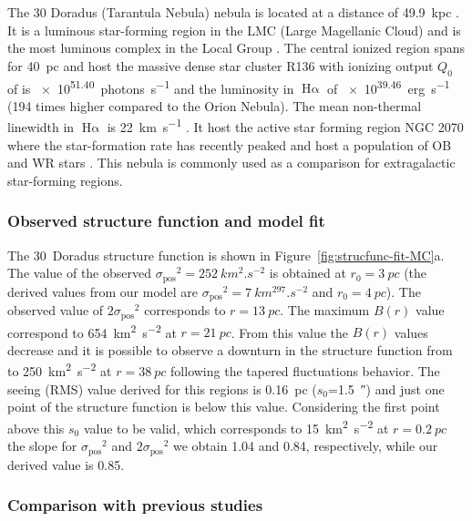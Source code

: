 \documentclass[fleqn,usenatbib, useAMS, a4paper]{mnras}
\newcommand\pos{\ensuremath{_{\mathrm{pos}}}}
\newcommand\ha{\ensuremath{\text{H}\upalpha}}
\begin{document}
The 30 Doradus (Tarantula Nebula) nebula is located at a distance of \SI{49.9}{kpc} \citetext{\SI{1}{\arcsecond} = \SI{0.24}{pc} ; \citealp{2013Natur.495...76P}}.
It is a luminous star-forming region in the LMC (Large Magellanic Cloud) and is the most luminous complex in the Local Group \citep{1984ApJ...287..116K}.
The central ionized region spans for \SI{40}{pc} and host the massive dense star cluster R136
with ionizing output \(Q_0\) of is \SI{e51.40}{photons.s^{-1}} \citep{2020MNRAS.499.1918B} and the luminosity in \ha{} of \SI{e39.46}{erg.s^{-1}} (194 times higher compared to the Orion Nebula).
The mean non-thermal linewidth in \ha{} is \SI{22}{km.s^{-1}} \citep{2013A&A...555A..60T}.
It host the active star forming region NGC 2070 \citep{2013AJ....145...98W} where the star-formation rate has recently peaked \citep{2015ApJ...811...76C} and host a population of OB and WR stars \citep{2011A&A...530A.108E}.
This nebula is commonly used as a comparison for extragalactic star-forming regions.

\subsubsection{Observed structure function and model fit}
\label{sec:observ-struct-funct-30dor}

The 30~Doradus structure function is shown in Figure~\ref{fig:strucfunc-fit-MC}a.
The value of the observed \(\sigma\pos^2 = \SI{252}{km^{2}.s^{-2}}\) is obtained at \(r_0 = \SI{3}{pc} \) (the derived values from our model are \(\sigma\pos^2 = \SI{7}{km^{297}.s^{-2}}\) and \(r_0 = \SI{4}{pc} \)).
The observed value of \(2\sigma\pos^2\) corresponds to \(r = \SI{13}{pc} \).
The maximum \(B(r)\) value correspond to \SI{654}{km^{2}.s^{-2}} at \(r = \SI{21}{pc}\).
From this value the \(B(r)\) values decrease and it is possible to observe a downturn in the structure function from to \SI{250}{km^{2}.s^{-2}} at \(r =  \SI{38}{pc}\) following the tapered fluctuations behavior.
The seeing (RMS) value derived for this regions is \SI{0.16}{pc} (\(s_0\)=\SI{1.5}{\arcsecond}) and just one point of the structure function is below this value.
Considering the first point above this \(s_0\) value to be valid, which corresponds to \SI{15}{km^{2}.s^{-2}} at \(r = \SI{0.2}{pc} \) the slope for \(\sigma\pos^2\) and \(2\sigma\pos^2\) we obtain \num{1.04} and \num{0.84}, respectively, while our derived value is \num{0.85}.

\subsubsection{Comparison with previous studies}
\label{sec:comparison-30dor}
\end{document}
